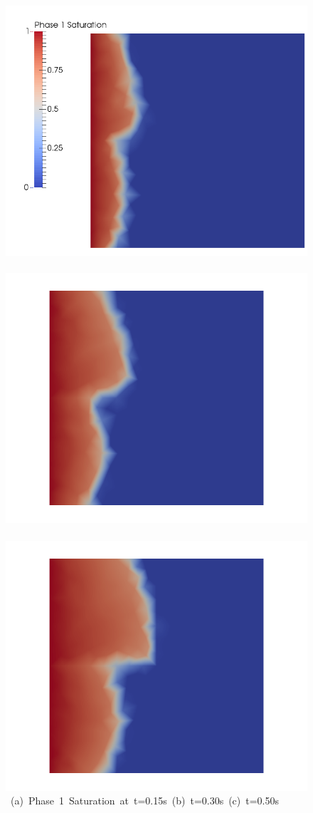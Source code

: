 \begin{landscape}
\begin{figure}[ht] 
\vbox{\vspace{-1cm}
\hspace{0.0cm} \hbox{\includegraphics[width=.56\textwidth]{./Pics/ArithMeanCase/ArithMeanCase_Saturation_t_dot15.png}
      \includegraphics[width=.56\textwidth]{./Pics/ArithMeanCase/ArithMeanCase_Saturation_t_dot30.png}
      \includegraphics[width=.56\textwidth]{./Pics/ArithMeanCase/ArithMeanCase_Saturation_t_dot50.png}}
\vspace{0.cm}
\hbox{\hspace{0.5cm} (a) Phase 1 Saturation at t=0.15s \hspace{3.75cm} (b) t=0.30s \hspace{5.0cm} (c) t=0.50s}
}
\end{figure}
\end{landscape}
